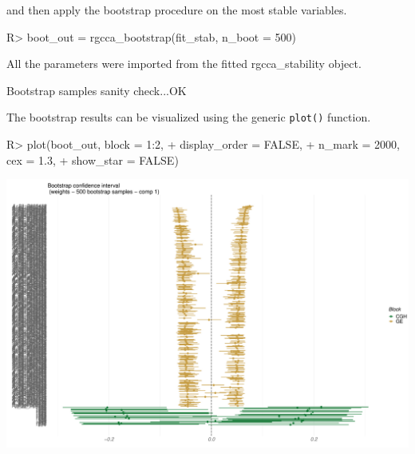 \documentclass[
]{jss}
\begin{document}
\normalsize

and then apply the bootstrap procedure on the most stable variables.

\footnotesize

\begin{CodeChunk}
\begin{CodeInput}
R> boot_out = rgcca_bootstrap(fit_stab, n_boot = 500)
\end{CodeInput}
\begin{CodeOutput}
All the parameters were imported from the fitted rgcca_stability object.
\end{CodeOutput}
\begin{CodeOutput}
Bootstrap samples sanity check...OK
\end{CodeOutput}
\end{CodeChunk}

\normalsize

The bootstrap results can be visualized using the generic
\texttt{plot()} function.

\footnotesize

\begin{CodeChunk}
\begin{CodeInput}
R> plot(boot_out, block = 1:2, 
+      display_order = FALSE, 
+      n_mark = 2000, cex = 1.3, 
+      show_star = FALSE)
\end{CodeInput}


\begin{center}\includegraphics{RGCCA_vignette_files/figure-latex/unnamed-chunk-46-1} \end{center}

\end{CodeChunk}
\end{document}
